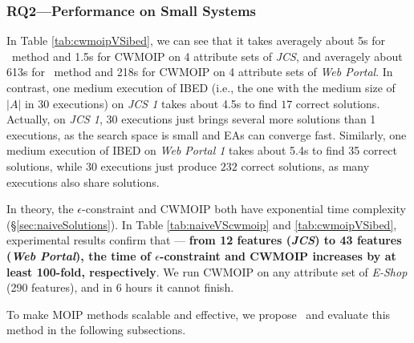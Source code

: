 \subsubsection{RQ2---Performance on Small Systems}\label{sec:results:rq2}
In Table \ref{tab:cwmoipVSibed}, we can see that it takes averagely about 5s for \naiveSol~method and 1.5s for CWMOIP on 4 attribute sets of \emph{JCS}, and averagely about 613s for \naiveSol~method and 218s for CWMOIP on 4 attribute sets of \emph{Web Portal}.
In contrast, one medium execution of IBED (i.e., the one with the medium size of $|A|$ in 30 executions)  on \emph{JCS 1} takes about 4.5s to find $17$ correct solutions. Actually, on \emph{JCS 1}, 30 executions just brings several more solutions than 1 executions, as the search space is small and EAs can converge fast. Similarly, one medium execution of IBED on \emph{Web Portal 1} takes about 5.4s to find 35 correct solutions, while 30 executions just produce $232$ correct solutions, as  many executions also share solutions. %

In theory, the $\epsilon$-constraint and CWMOIP both have exponential time complexity (\S\ref{sec:naiveSolutions}).
In Table \ref{tab:naiveVScwmoip} and \ref{tab:cwmoipVSibed}, experimental results confirm that --- \textbf{from 12 features (\emph{JCS}) to 43 features (\emph{Web Portal}), the time of $\epsilon$-constraint and CWMOIP increases by at least 100-fold, respectively}. We run CWMOIP on any attribute set of \emph{E-Shop} (290 features), and in 6 hours it cannot finish.

To make MOIP methods scalable and effective, we propose \ourSol~and evaluate this method in the following subsections.


